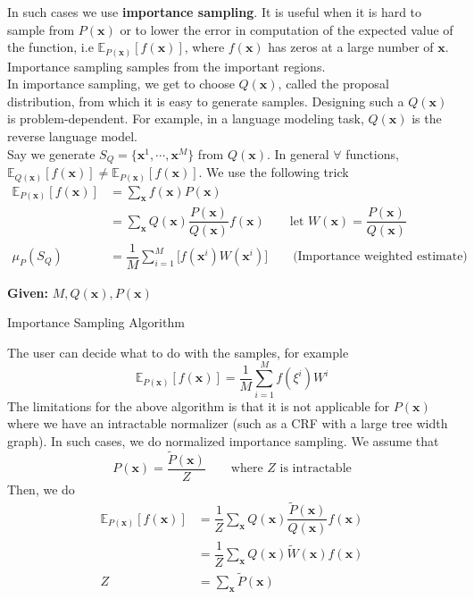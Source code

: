 In such cases we use \textbf{importance sampling}. It is useful when it is hard to sample from $P(\mathbf x)$ or to lower the error in computation of the expected value of the function, i.e $\mathbb{E}_{P(\mathbf x)} [f(\mathbf x)]$, where $f(\mathbf x)$ has zeros at a large number of $\mathbf x$. Importance sampling samples from the important regions. \\
In importance sampling, we get to choose $Q(\mathbf x)$, called the proposal distribution, from which it is easy to generate samples. Designing such a $Q(\mathbf x)$ is problem-dependent. For example, in a language modeling task, $Q(\mathbf x)$ is the reverse language model. \\
Say we generate $S_Q = \{\mathbf x^1, \cdots, \mathbf x^M\}$ from $Q(\mathbf x)$. In general $\forall$ functions, $\mathbb{E}_{Q(\mathbf x)}[f(\mathbf x)] \neq \mathbb{E}_{P(\mathbf x)}[f(\mathbf x)] $. We use the following trick
\begin{align*}
	\mathbb{E}_{P(\mathbf x)}[f(\mathbf x)] &= \sum_{\mathbf x} f(\mathbf x)P(\mathbf x) \\
	&= \sum_{\mathbf x} Q(\mathbf x) \dfrac{P(\mathbf x)}{Q(\mathbf x)}f(\mathbf x) \qquad\text{let } W(\mathbf x) = \dfrac{P(\mathbf x)}{Q(\mathbf x)}\\
\mu_P(S_Q)	&= \dfrac{1}{M} \sum_{i=1}^M \big[ f(\mathbf x^i) W(\mathbf x^i) \big] \qquad\text{(Importance weighted estimate)}
\end{align*}
\begin{algorithm}[H]\label{alg:s-is}
	\DontPrintSemicolon
	\textbf{Given:} $M, Q(\mathbf x), P(\mathbf x)$\;
	\caption{Importance Sampling Algorithm}
\end{algorithm}
The user can decide what to do with the samples, for example
\begin{equation}
	\mathbb{E}_{P(\mathbf x)}[f(\mathbf x)] = \dfrac{1}{M} \sum_{i=1}^M f(\xi^i) W^i
\end{equation}
The limitations for the above algorithm is that it is not applicable for $P(\mathbf x)$ where we have an intractable normalizer (such as a CRF with a large tree width graph). In such cases, we do normalized importance sampling. We assume that
\begin{equation}
	P(\mathbf x) = \dfrac{\widetilde{P}(\mathbf x)}{Z} \qquad \text{where }Z \text{ is intractable} 
\end{equation}
Then, we do
\begin{align*}
		\mathbb{E}_{P(\mathbf x)}[f(\mathbf x)] &= \dfrac{1}{Z} \sum_\mathbf{x} Q(\mathbf x) \dfrac{\widetilde{P}(\mathbf x)}{Q(\mathbf x)}f(\mathbf x) \\
		&= \dfrac{1}{Z} \sum_\mathbf{x} Q(\mathbf x) \widetilde{W}(\mathbf x)f(\mathbf x) \\
		Z &= \sum_{\mathbf x} \widetilde{P}(\mathbf x) 
\end{align*}